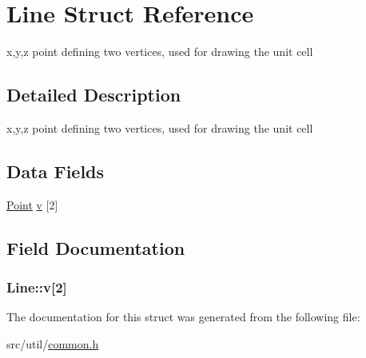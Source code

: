 \hypertarget{struct_line}{}\section{Line Struct Reference}
\label{struct_line}


x,y,z point defining two vertices, used for drawing the unit cell  




\subsection{Detailed Description}
x,y,z point defining two vertices, used for drawing the unit cell \subsection*{Data Fields}
\begin{DoxyCompactItemize}
\item 
\hyperlink{struct_point}{Point} \hyperlink{struct_line_a2b6117981e1506d29eb334203f3d6729}{v} \mbox{[}2\mbox{]}
\end{DoxyCompactItemize}


\subsection{Field Documentation}
\hypertarget{struct_line_a2b6117981e1506d29eb334203f3d6729}{}
\subsubsection[{v}]{ Line\+::v\mbox{[}2\mbox{]}}\label{struct_line_a2b6117981e1506d29eb334203f3d6729}


The documentation for this struct was generated from the following file\+:\begin{DoxyCompactItemize}
\item 
src/util/\hyperlink{common_8h}{common.\+h}\end{DoxyCompactItemize}
